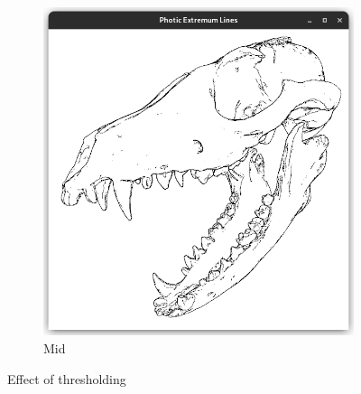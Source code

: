 \documentclass[9pt,fleqn,twoside,twocolumn]{stdglobal}
\begin{document}
\begin{figure}
\begin{subfigure}[b]{0.49\linewidth}
      \includegraphics[width=\textwidth,trim={15px 15 15 50},clip]{images/fox-skull-threshold-mid.png}
      \caption{Mid}
    \end{subfigure}
    \caption{Effect of thresholding}
  \end{figure}
\end{document}
